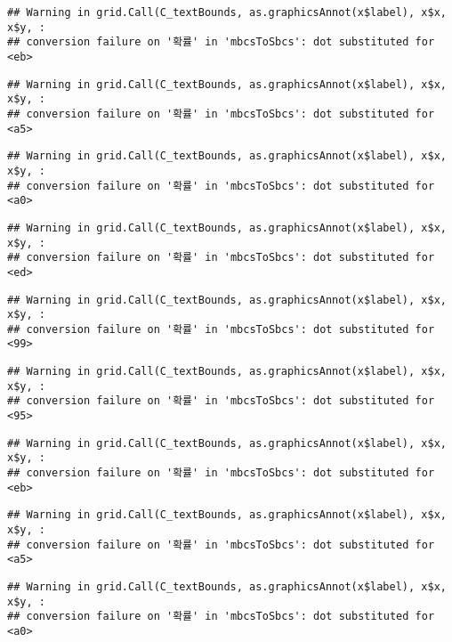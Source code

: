 \documentclass[]{book}
\begin{document}
\begin{verbatim}
## Warning in grid.Call(C_textBounds, as.graphicsAnnot(x$label), x$x, x$y, :
## conversion failure on '확률' in 'mbcsToSbcs': dot substituted for <eb>
\end{verbatim}

\begin{verbatim}
## Warning in grid.Call(C_textBounds, as.graphicsAnnot(x$label), x$x, x$y, :
## conversion failure on '확률' in 'mbcsToSbcs': dot substituted for <a5>
\end{verbatim}

\begin{verbatim}
## Warning in grid.Call(C_textBounds, as.graphicsAnnot(x$label), x$x, x$y, :
## conversion failure on '확률' in 'mbcsToSbcs': dot substituted for <a0>
\end{verbatim}

\begin{verbatim}
## Warning in grid.Call(C_textBounds, as.graphicsAnnot(x$label), x$x, x$y, :
## conversion failure on '확률' in 'mbcsToSbcs': dot substituted for <ed>
\end{verbatim}

\begin{verbatim}
## Warning in grid.Call(C_textBounds, as.graphicsAnnot(x$label), x$x, x$y, :
## conversion failure on '확률' in 'mbcsToSbcs': dot substituted for <99>
\end{verbatim}

\begin{verbatim}
## Warning in grid.Call(C_textBounds, as.graphicsAnnot(x$label), x$x, x$y, :
## conversion failure on '확률' in 'mbcsToSbcs': dot substituted for <95>
\end{verbatim}

\begin{verbatim}
## Warning in grid.Call(C_textBounds, as.graphicsAnnot(x$label), x$x, x$y, :
## conversion failure on '확률' in 'mbcsToSbcs': dot substituted for <eb>
\end{verbatim}

\begin{verbatim}
## Warning in grid.Call(C_textBounds, as.graphicsAnnot(x$label), x$x, x$y, :
## conversion failure on '확률' in 'mbcsToSbcs': dot substituted for <a5>
\end{verbatim}

\begin{verbatim}
## Warning in grid.Call(C_textBounds, as.graphicsAnnot(x$label), x$x, x$y, :
## conversion failure on '확률' in 'mbcsToSbcs': dot substituted for <a0>
\end{verbatim}
\end{document}
